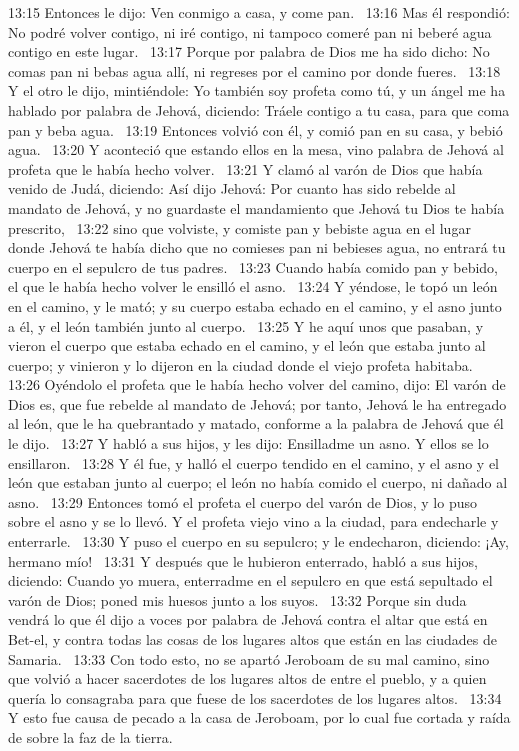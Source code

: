 13:15 Entonces le dijo: Ven conmigo a casa, y come pan.  
13:16 Mas él respondió: No podré volver contigo, ni iré contigo, ni tampoco comeré pan ni beberé agua contigo en este lugar.  
13:17 Porque por palabra de Dios me ha sido dicho: No comas pan ni bebas agua allí, ni regreses por el camino por donde fueres.  
13:18 Y el otro le dijo, mintiéndole: Yo también soy profeta como tú, y un ángel me ha hablado por palabra de Jehová, diciendo: Tráele contigo a tu casa, para que coma pan y beba agua.  
13:19 Entonces volvió con él, y comió pan en su casa, y bebió agua.  
13:20 Y aconteció que estando ellos en la mesa, vino palabra de Jehová al profeta que le había hecho volver.  
13:21 Y clamó al varón de Dios que había venido de Judá, diciendo: Así dijo Jehová: Por cuanto has sido rebelde al mandato de Jehová, y no guardaste el mandamiento que Jehová tu Dios te había prescrito,  
13:22 sino que volviste, y comiste pan y bebiste agua en el lugar donde Jehová te había dicho que no comieses pan ni bebieses agua, no entrará tu cuerpo en el sepulcro de tus padres.  
13:23 Cuando había comido pan y bebido, el que le había hecho volver le ensilló el asno.  
13:24 Y yéndose, le topó un león en el camino, y le mató; y su cuerpo estaba echado en el camino, y el asno junto a él, y el león también junto al cuerpo.  
13:25 Y he aquí unos que pasaban, y vieron el cuerpo que estaba echado en el camino, y el león que estaba junto al cuerpo; y vinieron y lo dijeron en la ciudad donde el viejo profeta habitaba.  
13:26 Oyéndolo el profeta que le había hecho volver del camino, dijo: El varón de Dios es, que fue rebelde al mandato de Jehová; por tanto, Jehová le ha entregado al león, que le ha quebrantado y matado, conforme a la palabra de Jehová que él le dijo.  
13:27 Y habló a sus hijos, y les dijo: Ensilladme un asno. Y ellos se lo ensillaron.  
13:28 Y él fue, y halló el cuerpo tendido en el camino, y el asno y el león que estaban junto al cuerpo; el león no había comido el cuerpo, ni dañado al asno.  
13:29 Entonces tomó el profeta el cuerpo del varón de Dios, y lo puso sobre el asno y se lo llevó. Y el profeta viejo vino a la ciudad, para endecharle y enterrarle.  
13:30 Y puso el cuerpo en su sepulcro; y le endecharon, diciendo: ¡Ay, hermano mío!  
13:31 Y después que le hubieron enterrado, habló a sus hijos, diciendo: Cuando yo muera, enterradme en el sepulcro en que está sepultado el varón de Dios; poned mis huesos junto a los suyos.  
13:32 Porque sin duda vendrá lo que él dijo a voces por palabra de Jehová contra el altar que está en Bet-el, y contra todas las cosas de los lugares altos que están en las ciudades de Samaria.  
13:33 Con todo esto, no se apartó Jeroboam de su mal camino, sino que volvió a hacer sacerdotes de los lugares altos de entre el pueblo, y a quien quería lo consagraba para que fuese de los sacerdotes de los lugares altos.  
13:34 Y esto fue causa de pecado a la casa de Jeroboam, por lo cual fue cortada y raída de sobre la faz de la tierra.  
